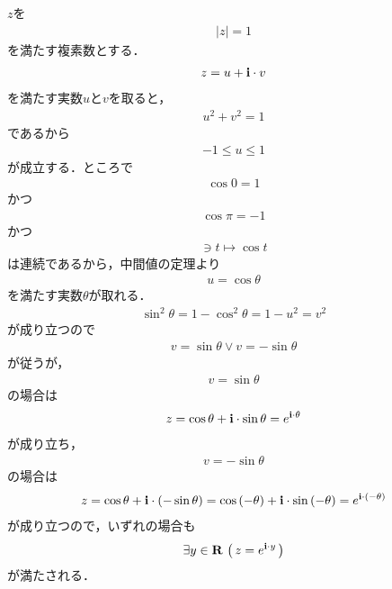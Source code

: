 	\begin{sketch}
		$z$を
		\begin{align}
			|z| = 1
		\end{align}
		を満たす複素数とする．
		\begin{align}
			z = u + \mathbf{i} \cdot v
		\end{align}
		を満たす実数$u$と$v$を取ると，
		\begin{align}
			u^2 + v^2 = 1
		\end{align}
		であるから
		\begin{align}
			-1 \leq u \leq 1
		\end{align}
		が成立する．ところで
		\begin{align}
			\cos{0} = 1
		\end{align}
		かつ
		\begin{align}
			\cos{\pi} = -1
		\end{align}
		かつ
		\begin{align}
			[0,\pi] \ni t \longmapsto \cos{t}
		\end{align}
		は連続であるから，中間値の定理より
		\begin{align}
			u = \cos{\theta}
		\end{align}
		を満たす実数$\theta$が取れる．
		\begin{align}
			\sin^2{\theta} = 1 - \cos^2{\theta} = 1 - u^2 = v^2
		\end{align}
		が成り立つので
		\begin{align}
			v = \sin{\theta} \vee v = -\sin{\theta}
		\end{align}
		が従うが，
		\begin{align}
			v = \sin{\theta}
		\end{align}
		の場合は
		\begin{align}
			z = \cos{\theta} + \mathbf{i} \cdot \sin{\theta} = e^{\mathbf{i} \cdot \theta}
		\end{align}
		が成り立ち，
		\begin{align}
			v = -\sin{\theta}
		\end{align}
		の場合は
		\begin{align}
			z = \cos{\theta} + \mathbf{i} \cdot (-\sin{\theta})
			= \cos{(-\theta)} + \mathbf{i} \cdot \sin{(-\theta)}
			= e^{\mathbf{i} \cdot (-\theta)}
		\end{align}
		が成り立つので，いずれの場合も
		\begin{align}
			\exists y \in \mathbf{R}\, \left(\, z = e^{\mathbf{i} \cdot y}\, \right)
		\end{align}
		が満たされる．
		\QED
	\end{sketch}
	
